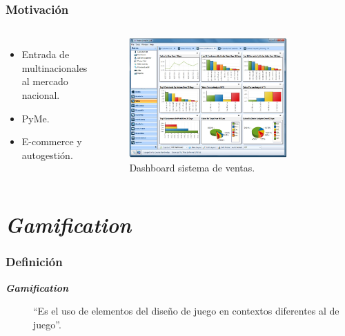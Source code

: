 \documentclass[10pt, compress]{beamer}
\begin{document}
\begin{frame}[fragile]
  \frametitle{Motivación}
\begin{columns}[onlytextwidth]
\begin{itemize}
\item Entrada de multinacionales \\
al mercado nacional.
\item PyMe. 
\item E-commerce y autogestión.
\end{itemize}

\begin{figure}
\centering
    \includegraphics[width=0.8\textwidth]{images/SalesDashboard.jpg}
    \caption{Dashboard sistema de ventas.}
    \label{fig:awesome_image}
\end{figure}
\end{columns}
\end{frame}

\section{\emph{Gamification}}

\begin{frame}[fragile]
  \frametitle{Definición}
  \begin{description}
    \item[\textbf{\emph{Gamification}}] ``Es el uso de elementos del diseño de juego en contextos diferentes al de 
juego''.
  \end{description}

\end{frame}
\end{document}
